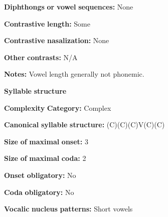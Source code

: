 \documentclass[output=paper]{langsci/langscibook}
\begin{document}
\begin{styleBody}
\textbf{Diphthongs} \textbf{or} \textbf{vowel} \textbf{sequences:} None
\end{styleBody}

\begin{styleBody}
\textbf{Contrastive} \textbf{length:} Some
\end{styleBody}

\begin{styleBody}
\textbf{Contrastive} \textbf{nasalization:} None
\end{styleBody}

\begin{styleBody}
\textbf{Other} \textbf{contrasts:} N/A
\end{styleBody}

\begin{styleBody}
\textbf{Notes:} Vowel length generally not phonemic.
\end{styleBody}

\begin{styleBody}
\textbf{Syllable} \textbf{structure}
\end{styleBody}

\begin{styleBody}
\textbf{Complexity} \textbf{Category:} Complex
\end{styleBody}

\begin{styleBody}
\textbf{Canonical} \textbf{syllable} \textbf{structure:} (C)(C)(C)V(C)(C) \citep[23-6]{Rumsey1978}
\end{styleBody}

\begin{styleBody}
\textbf{Size} \textbf{of} \textbf{maximal} \textbf{onset:} 3
\end{styleBody}

\begin{styleBody}
\textbf{Size} \textbf{of} \textbf{maximal} \textbf{coda:} 2
\end{styleBody}

\begin{styleBody}
\textbf{Onset} \textbf{obligatory:} No
\end{styleBody}

\begin{styleBody}
\textbf{Coda} \textbf{obligatory:} No
\end{styleBody}

\begin{styleBody}
\textbf{Vocalic} \textbf{nucleus} \textbf{patterns:} Short vowels
\end{styleBody}
\end{document}
